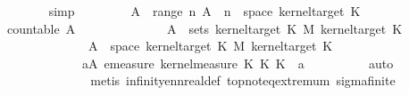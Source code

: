 \begin{isabellebody}
\ \ \ \ \ \ \isamarkupfalse%
\ simp\isanewline
\ \ \isamarkupfalse%
\isanewline
\ \ \ \ \isamarkupfalse%
\ {\isacharquery}{\kern0pt}A\ {\isacharequal}{\kern0pt}\ {\isachardoublequoteopen}range\ {\isacharparenleft}{\kern0pt}{\isasymlambda}n{\isachardot}{\kern0pt}\ {\isacharparenleft}{\kern0pt}A\ {\isasymomega}\ n\ {\isasymtimes}\ space\ {\isacharparenleft}{\kern0pt}kernel{\isacharunderscore}{\kern0pt}target\ K{\isacharunderscore}{\kern0pt}{}{\isacharparenright}{\kern0pt}{\isacharparenright}{\kern0pt}{\isacharparenright}{\kern0pt}{\isachardoublequoteclose}\isanewline
\ \ \ \ \isamarkupfalse%
\ {\isachardoublequoteopen}countable\ {\isacharquery}{\kern0pt}A\ {\isasymand}\isanewline
\ \ \ \ \ \ \ \ \ \ \ \ \ {\isacharquery}{\kern0pt}A\ {\isasymsubseteq}\ sets\ {\isacharparenleft}{\kern0pt}kernel{\isacharunderscore}{\kern0pt}target\ K{\isacharunderscore}{\kern0pt}{}\ {\isasymOtimes}\isactrlsub M\ kernel{\isacharunderscore}{\kern0pt}target\ K{\isacharunderscore}{\kern0pt}{}{\isacharparenright}{\kern0pt}\ {\isasymand}\isanewline
\ \ \ \ \ \ \ \ \ \ \ \ \ {\isasymUnion}\ {\isacharquery}{\kern0pt}A\ {\isacharequal}{\kern0pt}\ space\ {\isacharparenleft}{\kern0pt}kernel{\isacharunderscore}{\kern0pt}target\ K{\isacharunderscore}{\kern0pt}{}\ {\isasymOtimes}\isactrlsub M\ kernel{\isacharunderscore}{\kern0pt}target\ K{\isacharunderscore}{\kern0pt}{}{\isacharparenright}{\kern0pt}\ {\isasymand}\isanewline
\ \ \ \ \ \ \ \ \ \ \ \ \ {\isacharparenleft}{\kern0pt}{\isasymforall}a{\isasymin}{\isacharquery}{\kern0pt}A{\isachardot}{\kern0pt}\ emeasure\ {\isacharparenleft}{\kern0pt}kernel{\isacharunderscore}{\kern0pt}measure\ {\isacharparenleft}{\kern0pt}K{\isacharunderscore}{\kern0pt}{}\ {\isasymOtimes}\isactrlsub K\ K{\isacharunderscore}{\kern0pt}{}{\isacharparenright}{\kern0pt}\ {\isasymomega}\ a\ {\isasymnoteq}\ {\isasymtop}{\isacharparenright}{\kern0pt}{\isachardoublequoteclose}\isanewline
\ \ \ \ \ \ \isamarkupfalse%
\ auto\isanewline
\ \ \ \ \ \ \isamarkupfalse%
\ {}\ \isanewline
\ \ \ \ \ \ \ \ \ \ \isamarkupfalse%
\ {\isacharparenleft}{\kern0pt}metis\ infinity{\isacharunderscore}{\kern0pt}ennreal{\isacharunderscore}{\kern0pt}def\ top{\isachardot}{\kern0pt}not{\isacharunderscore}{\kern0pt}eq{\isacharunderscore}{\kern0pt}extremum\ sigma{\isacharunderscore}{\kern0pt}finite{\isacharparenright}{\kern0pt}\isanewline

\end{isabellebody}
